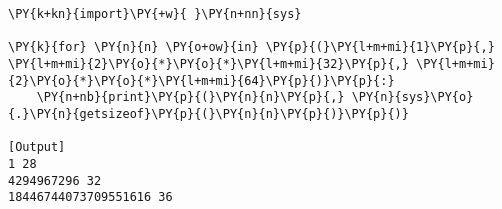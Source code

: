 \begin{Verbatim}[label=\makebox{\href{https://github.com/unipi-physics-labs/statnotes/tree/main/snippy/integer_size.py}{https://github.com/.../integer\_size.py}},commandchars=\\\{\}]
\PY{k+kn}{import}\PY{+w}{ }\PY{n+nn}{sys}

\PY{k}{for} \PY{n}{n} \PY{o+ow}{in} \PY{p}{(}\PY{l+m+mi}{1}\PY{p}{,} \PY{l+m+mi}{2}\PY{o}{*}\PY{o}{*}\PY{l+m+mi}{32}\PY{p}{,} \PY{l+m+mi}{2}\PY{o}{*}\PY{o}{*}\PY{l+m+mi}{64}\PY{p}{)}\PY{p}{:}
    \PY{n+nb}{print}\PY{p}{(}\PY{n}{n}\PY{p}{,} \PY{n}{sys}\PY{o}{.}\PY{n}{getsizeof}\PY{p}{(}\PY{n}{n}\PY{p}{)}\PY{p}{)}

[Output]
1 28
4294967296 32
18446744073709551616 36
\end{Verbatim}
